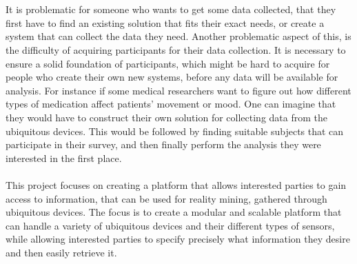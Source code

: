 \\\\
It is problematic for someone who wants to get some data collected, that they first have to find an existing solution that fits their exact needs, or create a system that can collect the data they need. Another problematic aspect of this, is the difficulty of acquiring participants for their data collection. It is necessary to ensure a solid foundation of participants, which might be hard to acquire for people who create their own new systems, before any data will be available for analysis. For instance if some medical researchers want to figure out how different types of medication affect patients' movement or mood. One can imagine that they would have to construct their own solution for collecting data from the ubiquitous devices. This would be followed by finding suitable subjects that can participate in their survey, and then finally perform the analysis they were interested in the first place.
\\\\
This project focuses on creating a platform that allows interested parties to gain access to information, that can be used for reality mining, gathered through ubiquitous devices. The focus is to create a modular and scalable platform that can handle a variety of ubiquitous devices and their different types of sensors, while allowing interested parties to specify precisely what information they desire and then easily retrieve it.



